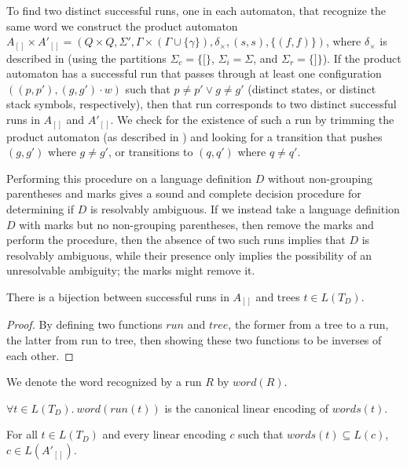 \documentclass[runningheads]{llncs}
\newcommand{\T}{\Sigma} %
\newcommand{\words}{\mathit{words}} %
\newcommand{\pospl}{[}
\newcommand{\pospr}{]}
\newcommand{\posp}[1]{\pospl#1\pospr}
\newcommand{\treetorun}{\mathit{run}}
\newcommand{\runtotree}{\mathit{tree}}
\newcommand{\runtoword}{\mathit{word}}
\begin{document}
\noindent To find two distinct successful runs, one in each automaton, that recognize the same word we construct the product automaton $A_{\posp{}} \times A'_{\posp{}} = (Q \times Q, \T', \Gamma \times (\Gamma \cup \{\gamma\}), \delta_{\times}, (s, s), \{(f, f)\})$, where $\delta_{\times}$ is described in \cite{alurVisiblyPushdownLanguages2004} (using the partitions $\T_c = \{ \pospl \}$, $\T_i = \T$, and $\T_r = \{\pospr\}$). If the product automaton has a successful run that passes through at least one configuration $((p, p'), (g, g')\cdot w)$ such that $p \neq p' \lor g \neq g'$ (distinct states, or distinct stack symbols, respectively), then that run corresponds to two distinct successful runs in $A_{\posp{}}$ and $A'_{\posp{}}$. We check for the existence of such a run by trimming the product automaton (as described in \cite{caralpTrimmingVisiblyPushdown2015}) and looking for a transition that pushes $(g, g')$ where $g \neq g'$, or transitions to $(q, q')$ where $q \neq q'$.

Performing this procedure on a language definition $D$ without non-grouping parentheses and marks gives a sound and complete decision procedure for determining if $D$ is resolvably ambiguous. If we instead take a language definition $D$ with marks but no non-grouping parentheses, then remove the marks and perform the procedure, then the absence of two such runs implies that $D$ is resolvably ambiguous, while their presence only implies the possibility of an unresolvable ambiguity; the marks might remove it.

\begin{lemma}
  There is a bijection between successful runs in $A_{\posp{}}$ and trees $t \in L(T_D)$.
\end{lemma}

\begin{proof}
  By defining two functions $\treetorun$ and $\runtotree$, the former from a tree to a run, the latter from run to tree, then showing these two functions to be inverses of each other.
\end{proof}

We denote the word recognized by a run $R$ by $\runtoword(R)$.

\begin{lemma}
  $\forall t \in L(T_D).\ \runtoword(\treetorun(t))$ is the canonical linear encoding of $\words(t)$.
\end{lemma}

\begin{lemma}
  For all $t \in L(T_D)$ and every linear encoding $c$ such that $\words(t) \subseteq L(c)$, $c \in L(A'_{\posp{}})$.
\end{lemma}
\end{document}
